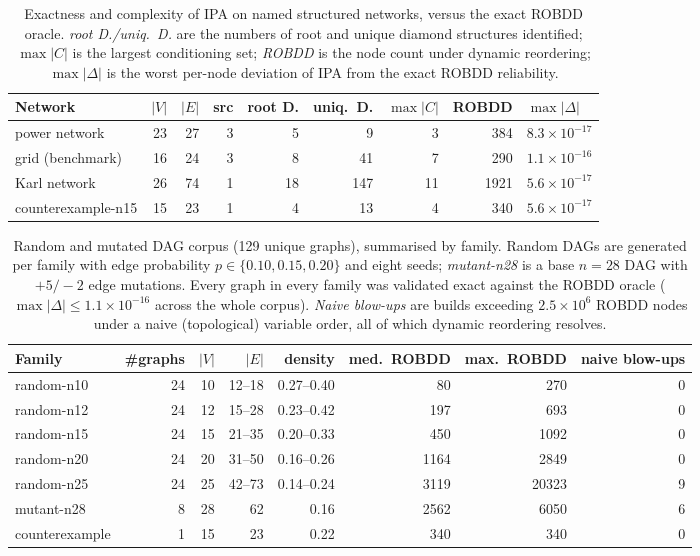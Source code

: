 \documentclass[preprint,12pt]{elsarticle}
\theoremstyle{definition}
\begin{document}
\begin{table}[t]
\centering\small
\caption{Exactness and complexity of IPA on named structured networks, versus the exact ROBDD oracle.
\emph{root D./uniq.\ D.} are the numbers of root and unique diamond structures identified;
$\max|C|$ is the largest conditioning set; \emph{ROBDD} is the node count under dynamic reordering;
$\max|\Delta|$ is the worst per-node deviation of IPA from the exact ROBDD reliability.}
\label{tab:structured}
\begin{tabular}{lrrrrrrrl}
\toprule
Network & $|V|$ & $|E|$ & src & root D. & uniq.\ D. & $\max|C|$ & ROBDD & $\max|\Delta|$\\
\midrule
power network      & 23 & 27 & 3 &  5 &   9 &  3 &  384 & $8.3\times10^{-17}$\\
grid (benchmark)   & 16 & 24 & 3 &  8 &  41 &  7 &  290 & $1.1\times10^{-16}$\\
Karl network       & 26 & 74 & 1 & 18 & 147 & 11 & 1921 & $5.6\times10^{-17}$\\
counterexample-n15 & 15 & 23 & 1 &  4 &  13 &  4 &  340 & $5.6\times10^{-17}$\\
\bottomrule
\end{tabular}
\end{table}

\begin{table}[t]
\centering\small
\caption{Random and mutated DAG corpus (129 unique graphs), summarised by family. Random DAGs are
generated per family with edge probability $p\in\{0.10,0.15,0.20\}$ and eight seeds; \emph{mutant-n28}
is a base $n{=}28$ DAG with $+5/-2$ edge mutations. Every graph in every family was validated exact
against the ROBDD oracle ($\max|\Delta|\le1.1\times10^{-16}$ across the whole corpus).
\emph{Naive blow-ups} are builds exceeding $2.5\times10^{6}$ ROBDD nodes under a naive (topological)
variable order, all of which dynamic reordering resolves.}
\label{tab:corpus}
\begin{tabular}{lrrrrrrr}
\toprule
Family & \#graphs & $|V|$ & $|E|$ & density & med.\ ROBDD & max.\ ROBDD & naive blow-ups\\
\midrule
random-n10  & 24 & 10 & 12--18 & 0.27--0.40 &   80 &   270 & 0\\
random-n12  & 24 & 12 & 15--28 & 0.23--0.42 &  197 &   693 & 0\\
random-n15  & 24 & 15 & 21--35 & 0.20--0.33 &  450 &  1092 & 0\\
random-n20  & 24 & 20 & 31--50 & 0.16--0.26 & 1164 &  2849 & 0\\
random-n25  & 24 & 25 & 42--73 & 0.14--0.24 & 3119 & 20323 & 9\\
mutant-n28  &  8 & 28 & 62     & 0.16       & 2562 &  6050 & 6\\
counterexample & 1 & 15 & 23   & 0.22       &  340 &   340 & 0\\
\bottomrule
\end{tabular}
\end{table}
\end{document}
